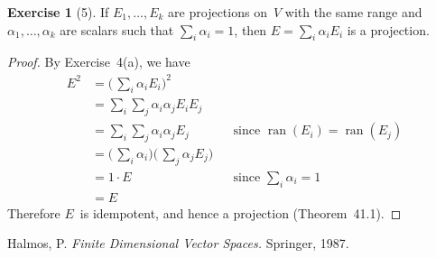\documentclass[letterpaper,12pt]{article}
\DeclareMathOperator{\ran}{ran}
\theoremstyle{definition}
\newtheorem*{exer}{Exercise}
\theoremstyle{remark}
\theoremstyle{direction}
\begin{document}
\begin{exer}[5]
If \(E_1,\ldots,E_k\) are projections on~\(V\) with the same range and \(\alpha_1,\ldots,\alpha_k\) are scalars such that \(\sum_i\alpha_i=1\), then \(E=\sum_i\alpha_i E_i\) is a projection.
\end{exer}
\begin{proof}
By Exercise~4(a), we have
\begin{align*}
E^2&=\bigl(\,\sum_i\alpha_iE_i\bigr)^2&&\\
	&=\sum_i\sum_j\alpha_i\alpha_j E_iE_j&&\\
	&=\sum_i\sum_j\alpha_i\alpha_j E_j&&\text{since \(\ran(E_i)=\ran(E_j)\)}\\
	&=\bigl(\,\sum_i\alpha_i\bigr)\bigl(\,\sum_j\alpha_jE_j\bigr)&&\\
	&=1\cdot E&&\text{since \(\textstyle\sum_i\alpha_i=1\)}\\
	&=E
\end{align*}
Therefore \(E\)~is idempotent, and hence a projection (Theorem~41.1).
\end{proof}

\begin{thebibliography}{0}
 Halmos, P. \textit{Finite Dimensional Vector Spaces.} Springer, 1987.
\end{thebibliography}
\end{document}
